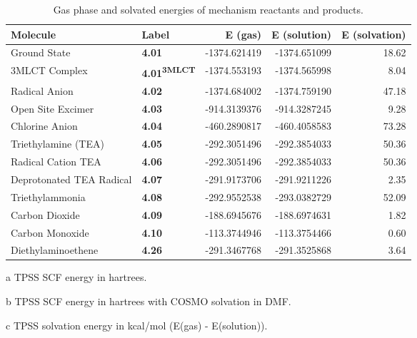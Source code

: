 \begin{table}[!htb]
\centering
 \begin{threeparttable}
  \caption[Gas phase and solvated energies for mechanism reactants and products]{Gas phase and solvated energies of mechanism reactants and products.}
    \begin{tabular}{llrrr}
    \toprule
    Molecule & Label & E (gas)\tnote{a} & E (solution)\tnote{b} & E (solvation)\tnote{c} \\
    \midrule
    Ground State & \textbf{4.01} & -1374.621419 & -1374.651099 & 18.62 \\
    3MLCT Complex & \textbf{4.01\textsuperscript{3MLCT}} & -1374.553193 & -1374.565998 & 8.04 \\
    Radical Anion & \textbf{4.02} & -1374.684002 & -1374.759190 & 47.18 \\
    Open Site Excimer & \textbf{4.03} & -914.3139376 & -914.3287245 & 9.28 \\
    Chlorine Anion & \textbf{4.04} & -460.2890817 & -460.4058583 & 73.28 \\
    Triethylamine (TEA) & \textbf{4.05} & -292.3051496 & -292.3854033 & 50.36 \\
    Radical Cation TEA & \textbf{4.06} & -292.3051496 & -292.3854033 & 50.36 \\
    Deprotonated TEA Radical & \textbf{4.07} & -291.9173706 & -291.9211226 & 2.35 \\
    Triethylammonia & \textbf{4.08} & -292.9552538 & -293.0382729 & 52.09 \\
    Carbon Dioxide & \textbf{4.09} & -188.6945676 & -188.6974631 & 1.82 \\
    Carbon Monoxide & \textbf{4.10} & -113.3744946 & -113.3754466 & 0.60 \\
    Diethylaminoethene & \textbf{4.26} & -291.3467768 & -291.3525868 & 3.64 \\
    \bottomrule
    \end{tabular}%
    \begin{tablenotes}
    \item [a] TPSS SCF energy in hartrees.
    \item [b] TPSS SCF energy in hartrees with COSMO solvation in DMF.
    \item [c] TPSS solvation energy in kcal/mol (E(gas) - E(solution)).
    \end{tablenotes}
  \label{tab.supenergy}%
 \end{threeparttable}
\end{table}%


